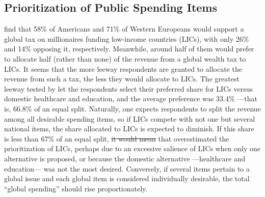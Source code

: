 \documentclass[12pt,english]{article}
\makeatletter
\providecommand{\DIFaddtex}[1]{{\protect\color{blue}\uwave{#1}}} %
\providecommand{\DIFdeltex}[1]{{\protect\color{red}\sout{#1}}} %
\providecommand{\DIFaddbegin}{} %
\providecommand{\DIFaddend}{} %
\providecommand{\DIFdelbegin}{} %
\providecommand{\DIFdelend}{} %
\providecommand{\DIFadd}[1]{\texorpdfstring{\DIFaddtex{#1}}{#1}} %
\providecommand{\DIFdel}[1]{\texorpdfstring{\DIFdeltex{#1}}{}} %
\providecommand{\DIFscaledelfig}{0.5}
\newlength{\DIFdelgraphicswidth} %
\newlength{\DIFdelgraphicsheight} %
\providecommand{\DIFaddincludegraphics}[2][]{{\color{blue}\fbox{\DIFOincludegraphics[#1]{#2}}}} %
\providecommand{\DIFdelincludegraphics}[2][]{%
\sbox{\DIFdelgraphicsbox}{\DIFOincludegraphics[#1]{#2}}%
\settoboxwidth{\DIFdelgraphicswidth}{\DIFdelgraphicsbox} %
\settoboxtotalheight{\DIFdelgraphicsheight}{\DIFdelgraphicsbox} %
\scalebox{\DIFscaledelfig}{%
\parbox[b]{\DIFdelgraphicswidth}{\usebox{\DIFdelgraphicsbox}\\[-\baselineskip] \rule{\DIFdelgraphicswidth}{0em}}\llap{\resizebox{\DIFdelgraphicswidth}{\DIFdelgraphicsheight}{%
\setlength{\unitlength}{\DIFdelgraphicswidth}%
\begin{picture}(1,1)%
\thicklines\linethickness{2pt} %
{\color[rgb]{1,0,0}\put(0,0){\framebox(1,1){}}}%
{\color[rgb]{1,0,0}\put(0,0){\line( 1,1){1}}}%
{\color[rgb]{1,0,0}\put(0,1){\line(1,-1){1}}}%
\end{picture}%
}\hspace*{3pt}}} %
} %
\DeclareRobustCommand{\DIFaddbegin}{\DIFOaddbegin \let\includegraphics\DIFaddincludegraphics} %
\DeclareRobustCommand{\DIFaddend}{\DIFOaddend \let\includegraphics\DIFOincludegraphics} %
\DeclareRobustCommand{\DIFdelbegin}{\DIFOdelbegin \let\includegraphics\DIFdelincludegraphics} %
\DeclareRobustCommand{\DIFdelend}{\DIFOaddend \let\includegraphics\DIFOincludegraphics} %
\let\sout@orig\sout %
\renewcommand{\sout}[1]{\ifmmode\text{\sout@orig{\ensuremath{#1}}}\else\sout@orig{#1}\fi} %
\makeatother
\begin{document}
\subsection{Prioritization of Public Spending Items}\label{subsec:revenue_split}

\cite{fabre_majority_2025} find that 58\% of Americans and 71\% of Western Europeans would support a global tax on millionaires funding low-income countries (LICs), with only 26\% and 14\% opposing it, respectively. Meanwhile, around half of them would prefer to allocate half (rather than none) of the revenue from a global wealth tax to LICs.  
It seems that the more leeway respondents are granted to allocate the revenue from such a tax, the less they would allocate to LICs. 
The greatest leeway tested by \cite{fabre_majority_2025} let the respondents select their preferred share for LICs versus domestic healthcare and education, %
and the average preference was 33.4\% ---that is, 66.8\% of an equal split. %
Naturally, one expects respondents to split the revenue among all desirable spending items, so %
if LICs compete with not one but several national items, the share allocated to LICs is expected to diminish. 
If this share is less than 67\% of an equal split, \DIFdelbegin \DIFdel{it would mean }\DIFdelend \DIFaddbegin \DIFadd{this would indicate }\DIFaddend that \cite{fabre_majority_2025} overestimated the prioritization of LICs, perhaps due to an excessive salience of LICs when only one alternative is proposed, or because the domestic alternative ---healthcare and education--- was not the most desired. %
Conversely, if several items pertain to a global issue and each global item is considered individually desirable, the total ``global spending'' should rise proportionately. 
\end{document}
